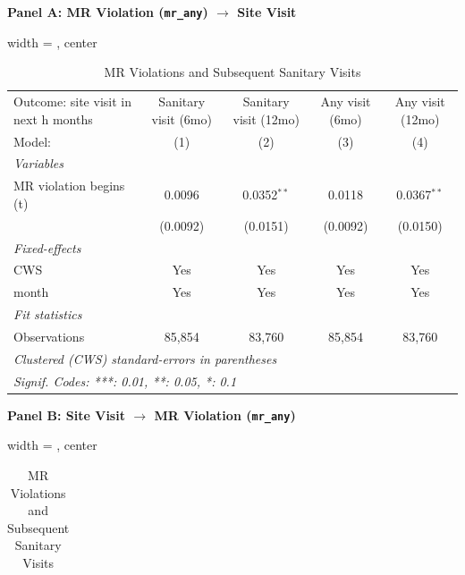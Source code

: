 \begin{table}[htbp]
\caption{\label{tab:mr_to_visit} MR Violations and Subsequent Sanitary Visits}
\bigskip
\centering
\textbf{Panel A: MR Violation (\texttt{mr\_any}) $\to$ Site Visit}\\[4pt]
\begin{adjustbox}{width = \textwidth, center}
\begingroup
\centering
\begin{tabular}{lcccc}
   \tabularnewline \midrule \midrule
   Outcome: site visit in next h months & Sanitary visit (6mo) & Sanitary visit (12mo) & Any visit (6mo) & Any visit (12mo) \\   
   Model:                               & (1)                  & (2)                   & (3)             & (4)\\  
   \midrule
   \emph{Variables}\\
   MR violation begins (t)              & 0.0096               & 0.0352$^{**}$         & 0.0118          & 0.0367$^{**}$\\   
                                        & (0.0092)             & (0.0151)              & (0.0092)        & (0.0150)\\   
   \midrule
   \emph{Fixed-effects}\\
   CWS                                  & Yes                  & Yes                   & Yes             & Yes\\  
   month                                & Yes                  & Yes                   & Yes             & Yes\\  
   \midrule
   \emph{Fit statistics}\\
   Observations                         & 85,854               & 83,760                & 85,854          & 83,760\\  
   \midrule \midrule
   \multicolumn{5}{l}{\emph{Clustered (CWS) standard-errors in parentheses}}\\
   \multicolumn{5}{l}{\emph{Signif. Codes: ***: 0.01, **: 0.05, *: 0.1}}\\
\end{tabular}
\par\endgroup
\end{adjustbox}
\vspace{8pt}
\textbf{Panel B: Site Visit $\to$ MR Violation (\texttt{mr\_any})}\\[4pt]
\begin{adjustbox}{width = \textwidth, center}
\begingroup
\centering
\begin{tabular}{lcccc}
   \tabularnewline \midrule \midrule

\end{tabular}
\end{adjustbox}
\end{table}
